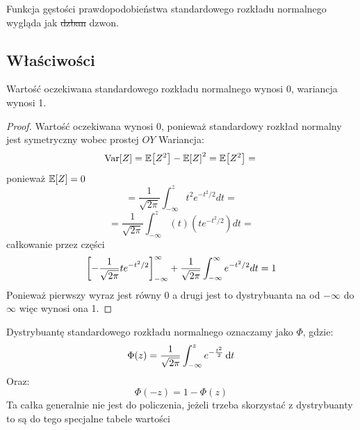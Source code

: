 Funkcja gęstości prawdopodobieństwa standardowego rozkładu normalnego wygląda jak \sout{dzban} dzwon.


\subsection{Właściwości}
\begin{theorem}
	Wartość oczekiwana standardowego rozkładu normalnego wynosi 0, wariancja wynosi 1.
\end{theorem}

\begin{proof}
	Wartość oczekiwana wynosi 0, ponieważ standardowy rozkład normalny jest symetryczny wobec prostej \( OY\)
	Wariancja:
	\[
		\variance{Z} = \expected{Z^2} - \expected{Z}^2 = \expected{Z^2} = \\
	\]
	ponieważ \( \expected{Z} = 0 \)
	\[
		= \frac{1}{\sqrt{2\pi}}\int_{-\infty}^{z}t^2e^{-t^2/2} dt =
	\]
	\[
		= \frac{1}{\sqrt{2\pi}}\int_{-\infty}^{z}(t)(te^{-t^2/2}) dt =
	\]
	całkowanie przez części
	\[
		\left[-\frac{1}{\sqrt{2\pi}}te^{-t^2/2}\right]_{-\infty}^{\infty} + \frac{1}{\sqrt{2\pi}}\int_{-\infty}^{\infty}e^{-t^2/2} dt = 1
	\]
	Ponieważ pierwszy wyraz jest równy 0 a drugi jest to dystrybuanta na od \(-\infty \) do \( \infty \) więc wynosi ona 1.
\end{proof}
\begin{definition}
	Dystrybuantę standardowego rozkładu normalnego oznaczamy jako \( \Phi \), gdzie:
	\[
		\Phi(z) = \frac{1}{\sqrt{2\pi}} \int_{-\infty}^{z} e^{-\frac{t^2}{2}} \mathop{}\!\mathrm{d} t
	\]
	Oraz:
	\[
		\Phi(-z) = 1 - \Phi(z)
	\]
	Ta całka generalnie nie jest do policzenia, jeżeli trzeba skorzystać z dystrybuanty to są do tego specjalne tabele wartości
\end{definition}
